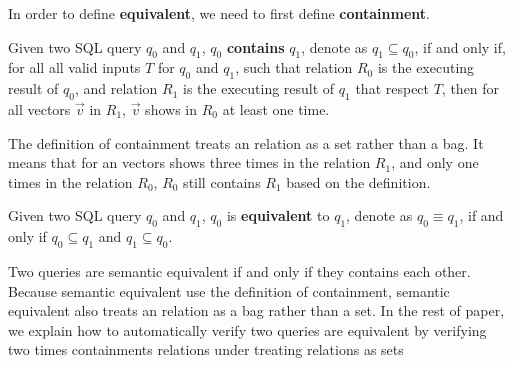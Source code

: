%
In order to define \textbf{equivalent}, we need to first define \textbf{containment}.
%
\begin{mydef}
Given two SQL query $q_0$ and $q_1$, $q_0$ \textbf{contains} $q_1$, denote as $q_1 \subseteq q_0$, if and only if, 
for all all valid inputs $T$ for $q_0$ and $q_1$, 
such that relation $R_0$ is the executing result of $q_0$, and relation $R_1$ is the executing result of $q_1$ that respect $T$, then 
for all vectors $\vec{v}$ in $R_1$, $\vec{v}$ shows in $R_0$ at least one time. 
\end{mydef}
%
The definition of containment treats an relation as a set rather than a bag.
%
It means that for an vectors shows three times in the relation $R_1$, and only one times in the relation $R_0$, $R_0$ still contains $R_1$ based on the
definition.
\begin{mydef}
Given two SQL query $q_0$ and $q_1$, $q_0$ is \textbf{equivalent} to $q_1$, denote as $q_0 \equiv q_1$, if and only if 
$q_0 \subseteq q_1$ and $q_1 \subseteq q_0$.
\end{mydef}
Two queries are semantic equivalent if and only if they contains each other.
%
Because semantic equivalent use the definition of containment, semantic equivalent also treats an relation as a bag rather than a set.
%
In the rest of paper, we explain how to automatically verify two queries are equivalent by verifying two times containments relations under treating 
relations as sets
